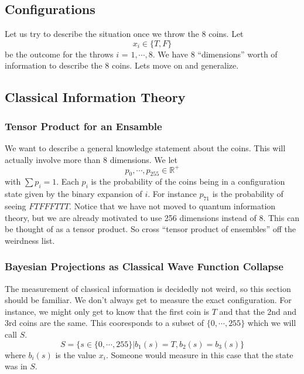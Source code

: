 \documentclass[12pt,a4paper]{article}
\begin{document}
\subsection{Configurations}
Let us try to describe the situation once we throw the 8 coins.  Let
\[
x_i \in \{T,F\}
\]
be the outcome for the throws $i$ = $1,\cdots,8$.  We have 8 ``dimensions'' worth of information to describe the 8 coins.  Lets move on and generalize.
  
\subsection{Classical Information Theory}
\subsubsection{Tensor Product for an Ensamble}
We want to describe a general knowledge statement about the coins.  This will actually involve more than 8 dimensions.  We let
\[
   p_0,\cdots,p_{255} \in \mathbb{R}^+
\]
with $\sum p_i = 1$.  Each $p_i$ is the probability of the coins being in a configuration state given by the binary expansion of $i$.  For instance $p_{71}$ is the probability of seeing $FTFFFTTT$. Notice that we have not moved to quantum information theory, but we are already motivated to use 256 dimensions instead of 8.  This can be thought of as a tensor product.  So cross ``tensor product of ensembles'' off the weirdness list.

\subsubsection{Bayesian Projections as Classical Wave Function Collapse}
The measurement of classical information is decidedly not weird, so this section should be familiar.  We don't always get to measure the exact configuration.  For instance, we might only get to know that the first coin is $T$ and that the 2nd and 3rd coins are the same.  This cooresponds to a subset of $\{0,\cdots,255\}$ which we will call $S$.
\[
   S = \{s \in \{0,\cdots,255\} | b_1(s) = T, b_2(s) = b_3(s) \}
\]
where $b_i(s)$ is the value $x_i$.  Someone would measure in this case that the state was in $S$.
\end{document}
